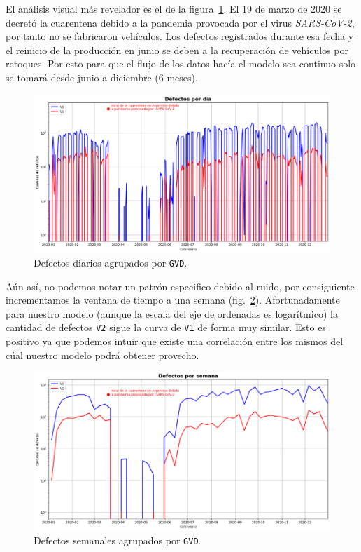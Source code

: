 \documentclass[a4paper,12pt]{article}
\begin{document}
		\clearpage
		
		El análisis visual más revelador es el de la figura~\ref{fig:defectsperday}. El 19 de marzo de 2020 se decretó la cuarentena debido a la pandemia provocada por el virus \textit{SARS-CoV-2}, por tanto no se fabricaron vehículos. Los defectos registrados durante esa fecha y el reinicio de la producción en junio se deben a la recuperación de vehículos por retoques. Por esto para que el flujo de los datos hacía el modelo sea continuo solo se tomará desde junio a diciembre (6 meses).
		
		\begin{figure}[H]
			\begin{center}
				\includegraphics[width=1\textwidth]{tesis_64.png}
				\caption{Defectos diarios agrupados por \texttt{GVD}.}
				\label{fig:defectsperday}
			\end{center}
		\end{figure}
		
		\clearpage
		
		Aún así, no podemos notar un patrón especifico debido al ruido, por consiguiente incrementamos la ventana de tiempo a una semana (fig.~\ref{fig:defectsperweek}). Afortunadamente para nuestro modelo (aunque la escala del eje de ordenadas es logarítmico) la cantidad de defectos \texttt{V2} sigue la curva de \texttt{V1} de forma muy similar. Esto es positivo ya que podemos intuir que existe una correlación entre los mismos del cúal nuestro modelo podrá obtener provecho.
		
		\begin{figure}[H]
			\begin{center}
				\includegraphics[width=1\textwidth]{tesis_63.png}
				\caption{Defectos semanales agrupados por \texttt{GVD}.}
				\label{fig:defectsperweek}
			\end{center}
		\end{figure}
		
\end{document}
